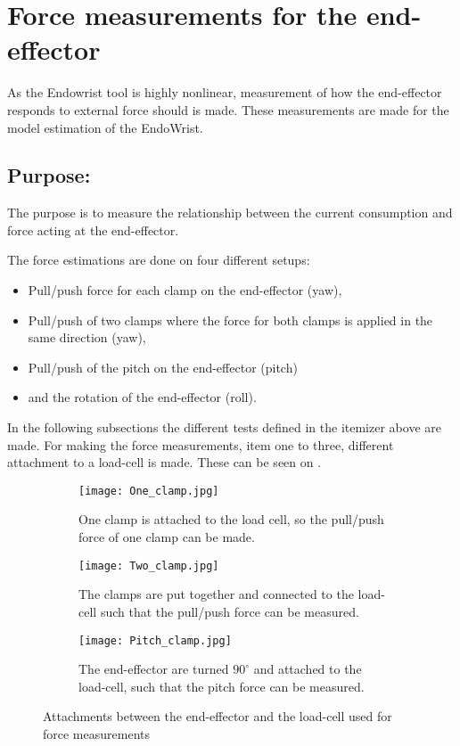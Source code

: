 \section{Force measurements for the end-effector} %

As the Endowrist tool is highly nonlinear, measurement of how the end-effector responds to external force should is made. These measurements are made for the model estimation of the EndoWrist.  

\subsection*{Purpose:}
The purpose is to measure the relationship between the current consumption and force acting at the end-effector.

The force estimations are done on four different setups:
\begin{itemize}
\item Pull/push force for each clamp on the end-effector (yaw),
\item Pull/push of two clamps where the force for both clamps is applied in the same direction (yaw),
\item Pull/push of the pitch on the end-effector (pitch)
\item and the rotation of the end-effector (roll).
\end{itemize}

In the following subsections the different tests defined in the itemizer above are made. For making the force measurements, item one to three, different attachment to a load-cell is made. These can be seen on .

\begin{figure}[H]
	\centering
	\begin{subfigure}{.32\textwidth}
		\centering
		\vspace{-12pt}
		\texttt{[image: One\_clamp.jpg]}
		\caption{One clamp is attached to the load cell, so the pull/push force of one clamp can be made.}
		\label{fig:one_clamp}
	\end{subfigure}
	\begin{subfigure}{.32\textwidth}
		\centering
		\texttt{[image: Two\_clamp.jpg]}
		\caption{The clamps are put together and connected to the load-cell such that the pull/push force can be measured.}
		\label{fig:two_clamp}
	\end{subfigure}
	\begin{subfigure}{.32\textwidth}
		\centering
		\texttt{[image: Pitch\_clamp.jpg]}
		\caption{The end-effector are turned $90^\circ$ and attached to the load-cell, such that the pitch force can be measured.}
		\label{fig:pitch_force}
	\end{subfigure}
\caption{Attachments between the end-effector and the load-cell used for force measurements}
\label{fig:Overview_endowrist_attachment}
\end{figure}

